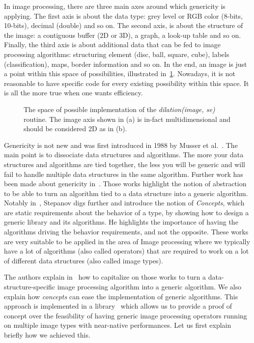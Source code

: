 In image processing, there are three main axes around which genericity is applying. The first axis is about the data type:
grey level or RGB color (8-bits, 10-bits), decimal (double) and so on. The second axis, is about the structure of the
image: a contiguous buffer (2D or 3D), a graph, a look-up table and so on. Finally, the third axis is about additional
data that can be fed to image processing algorithms: structuring element (disc, ball, square, cube), labels
(classification), maps, border information and so on. In the end, an image is just a point within this space of
possibilities, illustrated in~\ref{fig:gen.espaceSAV}. Nowadays, it is not reasonable to have specific code for every
existing possibility within this space. It is all the more true when one wants efficiency.

\begin{figure}[tbh]
  \centering
  \subfloat[]{}
  \hfil
  \subfloat[]{}
  \caption{The space of possible implementation of the \emph{dilation(image, se)} routine. The image axis shown in (a)
    is in-fact multidimensional and should be considered 2D as in (b).}
  \label{fig:gen.espaceSAV}
\end{figure}

Genericity is not new and was first introduced in 1988 by Musser et al.~\cite{musser.1988.generic}. The main point is to
dissociate data structures and algorithms. The more your data structures and algorithms are tied together, the less you
will be generic and will fail to handle multiple data structures in the same algorithm. Further work has been made about
genericity in~\cite{musser.1994.algorithm, dehnert.1998.fundamentals}. Those works highlight the notion of abstraction
to be able to turn an algorithm tied to a data structure into a generic algorithm. Notably
in~\cite{stepanov.2009.elements}, Stepanov digs further and introduce the notion of \emph{Concepts}, which are static
requirements about the behavior of a type, by showing how to design a generic library and its algorithms. He highlights
the importance of having the algorithms driving the behavior requirements, and not the opposite. These works are very
suitable to be applied in the area of Image processing where we typically have a lot of algorithms (also called
operators) that are required to work on a lot of different data structures (also called image types).

The authors explain in~\cite{roynard.2019.rrpr} how to capitalize on those works to turn a data-structure-specific image
processing algorithm into a generic algorithm. We also explain how \emph{concepts} can ease the implementation of
generic algorithms. This approach is implemented in a library~\cite{carlinet.2018.pylena} which allows us to provide a
proof of concept over the feasibility of having generic image processing operators running on multiple image types with
near-native performances. Let us first explain briefly how we achieved this.

